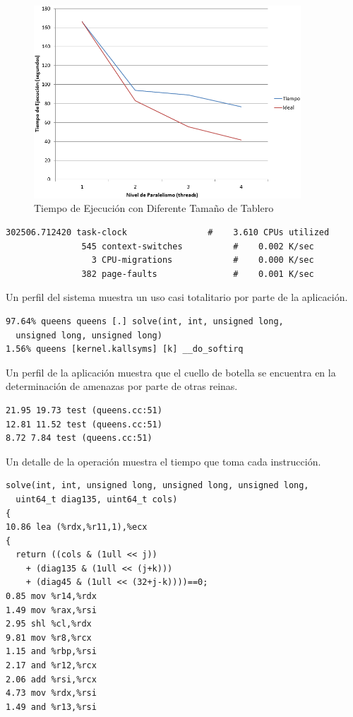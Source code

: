 \documentclass[a4paper]{report}
\begin{document}
\begin{figure}[H]
\centering
\includegraphics[width=10cm]{queen-scaling.png}
\caption{Tiempo de Ejecución con Diferente Tamaño de Tablero}
\label{fig:queen-scaling}
\end{figure}

\begin{verbatim}
302506.712420 task-clock                #    3.610 CPUs utilized
               545 context-switches          #    0.002 K/sec
                 3 CPU-migrations            #    0.000 K/sec
               382 page-faults               #    0.001 K/sec
\end{verbatim}

Un perfil del sistema muestra un uso casi totalitario por parte de la aplicación.

\begin{verbatim}
97.64% queens queens [.] solve(int, int, unsigned long,
  unsigned long, unsigned long)
1.56% queens [kernel.kallsyms] [k] __do_softirq
\end{verbatim}

Un perfil de la aplicación muestra que el cuello de botella se encuentra en la determinación de amenazas por parte de
otras reinas.

\begin{verbatim}
21.95 19.73 test (queens.cc:51)
12.81 11.52 test (queens.cc:51)
8.72 7.84 test (queens.cc:51)
\end{verbatim}

Un detalle de la operación muestra el tiempo que toma cada instrucción.

\begin{verbatim}
solve(int, int, unsigned long, unsigned long, unsigned long,
  uint64_t diag135, uint64_t cols)                                                                                             {
10.86 lea (%rdx,%r11,1),%ecx
{
  return ((cols & (1ull << j))
    + (diag135 & (1ull << (j+k)))
    + (diag45 & (1ull << (32+j-k))))==0;
0.85 mov %r14,%rdx
1.49 mov %rax,%rsi
2.95 shl %cl,%rdx
9.81 mov %r8,%rcx
1.15 and %rbp,%rsi
2.17 and %r12,%rcx
2.06 add %rsi,%rcx
4.73 mov %rdx,%rsi
1.49 and %r13,%rsi
\end{verbatim}
\end{document}
